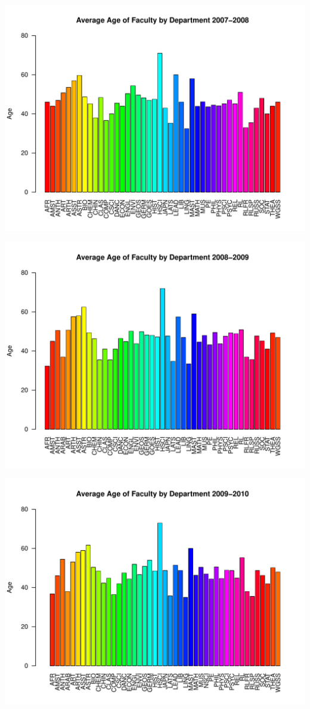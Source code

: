 \documentclass[12pt,a4paper]{article}\usepackage[]{graphicx}\usepackage[]{color}
\makeatletter
\def\maxwidth{ %
  \ifdim\Gin@nat@width>\linewidth
    \linewidth
  \else
    \Gin@nat@width
  \fi
}
\newenvironment{knitrout}{}{} %
\theoremstyle{definition}
\makeatother
\begin{document}
\begin{knitrout}
\includegraphics[width=\maxwidth]{figure/unnamed-chunk-10-4} 

\includegraphics[width=\maxwidth]{figure/unnamed-chunk-10-5} 

\includegraphics[width=\maxwidth]{figure/unnamed-chunk-10-6} 


\end{knitrout}
\end{document}
